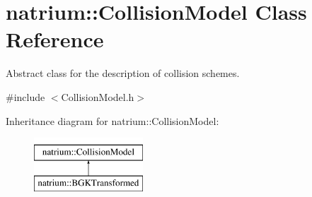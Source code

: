 \hypertarget{classnatrium_1_1CollisionModel}{\section{natrium\-:\-:Collision\-Model Class Reference}
\label{classnatrium_1_1CollisionModel}
}


Abstract class for the description of collision schemes.  




{\ttfamily \#include $<$Collision\-Model.\-h$>$}

Inheritance diagram for natrium\-:\-:Collision\-Model\-:\begin{figure}[H]
\begin{center}
\leavevmode
\includegraphics[height=2.000000cm]{classnatrium_1_1CollisionModel}
\end{center}
\end{figure}
